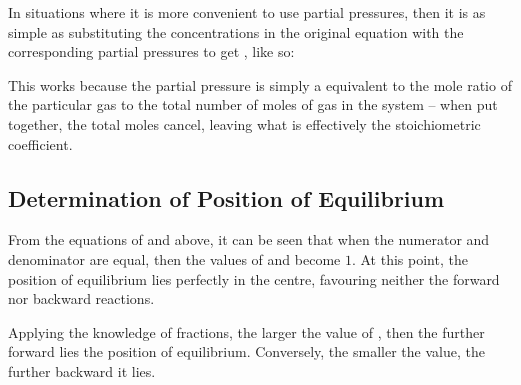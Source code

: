 			In situations where it is more convenient to use partial pressures, then it is as simple as substituting the concentrations
			in the original \Kc equation with the corresponding partial pressures to get \Kp, like so:


			This works because the partial pressure is simply a equivalent to the mole ratio of the particular gas to the total number of
			moles of gas in the system -- when put together, the total moles cancel, leaving what is effectively the stoichiometric
			coefficient.



		\pagebreak
		\subsection{Determination of Position of Equilibrium}

			From the equations of \Kc and \Kp above, it can be seen that when the numerator and denominator are equal, then the values of
			\Kc and \Kp become $1$. At this point, the position of equilibrium lies perfectly in the centre, favouring neither the forward
			nor backward reactions.

			Applying the knowledge of fractions, the larger the value of \Kc, then the further forward lies the position of equilibrium.
			Conversely, the smaller the value, the further backward it lies.

			\begin{center}
			\end{center}


